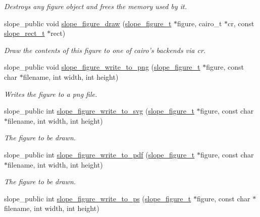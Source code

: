 \begin{DoxyCompactItemize}
\begin{DoxyCompactList}\small\item\em Destroys any figure object and frees the memory used by it. \end{DoxyCompactList}\item 
slope\+\_\+public void \hyperlink{group__Figure_ga386e261642ba2b0fdc39a550e3e94462}{slope\+\_\+figure\+\_\+draw} (\hyperlink{group__Figure_ga507cc82eeca8255d6c0f603ffdaeb59e}{slope\+\_\+figure\+\_\+t} $\ast$figure, cairo\+\_\+t $\ast$cr, const \hyperlink{struct__slope__rect}{slope\+\_\+rect\+\_\+t} $\ast$rect)
\begin{DoxyCompactList}\small\item\em Draw the contents of this figure to one of cairo's backends via cr. \end{DoxyCompactList}\item 
slope\+\_\+public void \hyperlink{group__Figure_ga586a40d60b3c5feec3f74f1bb00b011d}{slope\+\_\+figure\+\_\+write\+\_\+to\+\_\+png} (\hyperlink{group__Figure_ga507cc82eeca8255d6c0f603ffdaeb59e}{slope\+\_\+figure\+\_\+t} $\ast$figure, const char $\ast$filename, int width, int height)
\begin{DoxyCompactList}\small\item\em Writes the figure to a png file. \end{DoxyCompactList}\item 
slope\+\_\+public int \hyperlink{group__Figure_ga18b13f5d94a871984760eaa4b5f5f4ae}{slope\+\_\+figure\+\_\+write\+\_\+to\+\_\+svg} (\hyperlink{group__Figure_ga507cc82eeca8255d6c0f603ffdaeb59e}{slope\+\_\+figure\+\_\+t} $\ast$figure, const char $\ast$filename, int width, int height)
\begin{DoxyCompactList}\small\item\em The figure to be drawn. \end{DoxyCompactList}\item 
slope\+\_\+public int \hyperlink{group__Figure_ga3d70896b8765c2ea7058e5213daa17fd}{slope\+\_\+figure\+\_\+write\+\_\+to\+\_\+pdf} (\hyperlink{group__Figure_ga507cc82eeca8255d6c0f603ffdaeb59e}{slope\+\_\+figure\+\_\+t} $\ast$figure, const char $\ast$filename, int width, int height)
\begin{DoxyCompactList}\small\item\em The figure to be drawn. \end{DoxyCompactList}\item 
slope\+\_\+public int \hyperlink{group__Figure_gaad033abcd87cdbae258f073c6f43101b}{slope\+\_\+figure\+\_\+write\+\_\+to\+\_\+ps} (\hyperlink{group__Figure_ga507cc82eeca8255d6c0f603ffdaeb59e}{slope\+\_\+figure\+\_\+t} $\ast$figure, const char $\ast$filename, int width, int height)

\end{DoxyCompactItemize}
